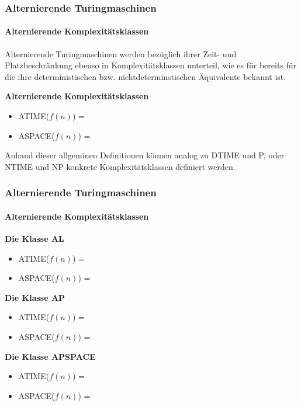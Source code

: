 \begin{frame}
    \frametitle{Alternierende Turingmaschinen}
    \framesubtitle{Alternierende Komplexitätsklassen}
    Alternierende Turingmaschinen werden bezüglich ihrer Zeit- und Platzbeschränkung ebenso in Komplexitätsklassen unterteil, wie 
    es für bereits für die ihre deterministischen bzw. nichtdeterminstischen Äquivalente bekannt ist.
    \begin{block}{\textbf{Alternierende Komplexitätsklassen}}
        \begin{itemize}
            \item ATIME($f(n)$) = 
            \item ASPACE($f(n)$) = 
        \end{itemize}
    \end{block}
    Anhand dieser allgeminen Definitionen können analog zu DTIME und P, oder NTIME und NP konkrete Komplexitätsklassen definiert werden.
\end{frame}

\begin{frame}
    \frametitle{Alternierende Turingmaschinen}
    \framesubtitle{Alternierende Komplexitätsklassen}
    
    \begin{block}{\textbf{Die Klasse AL}}
        \begin{itemize}
            \item ATIME($f(n)$) = 
            \item ASPACE($f(n)$) = 
        \end{itemize}
    \end{block}

    \begin{block}{\textbf{Die Klasse AP}}
        \begin{itemize}
            \item ATIME($f(n)$) = 
            \item ASPACE($f(n)$) = 
        \end{itemize}
    \end{block}

    \begin{block}{\textbf{Die Klasse APSPACE}}
        \begin{itemize}
            \item ATIME($f(n)$) = 
            \item ASPACE($f(n)$) = 
        \end{itemize}
    \end{block}

\end{frame}


